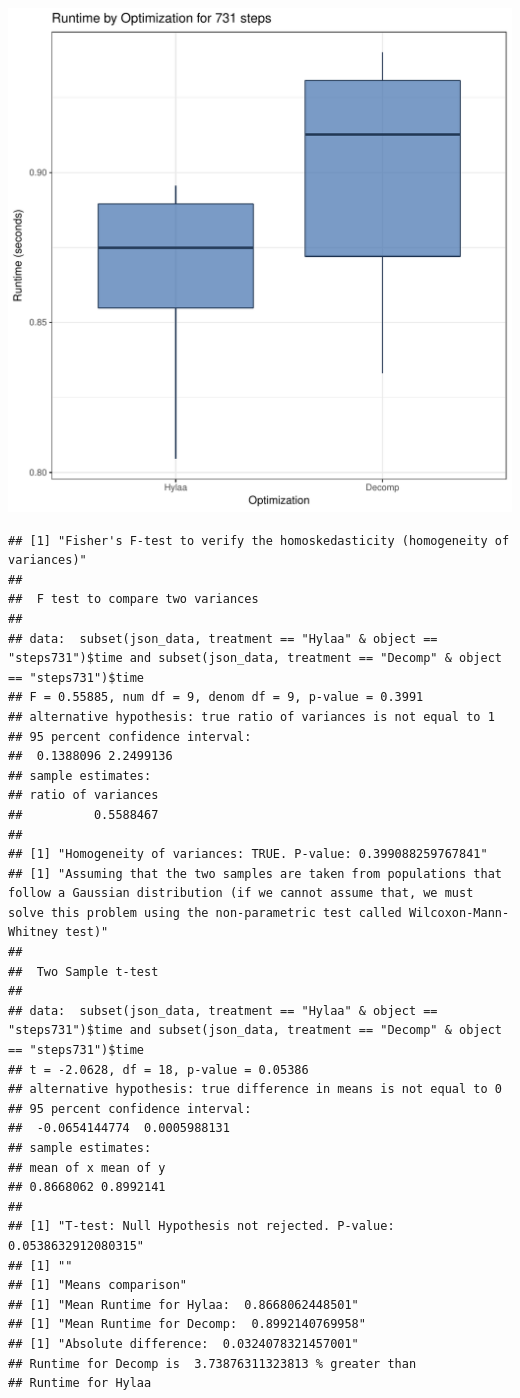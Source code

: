 \documentclass{article}\usepackage[]{graphicx}\usepackage[]{color}
\makeatletter
\def\maxwidth{ %
  \ifdim\Gin@nat@width>\linewidth
    \linewidth
  \else
    \Gin@nat@width
  \fi
}
\newenvironment{kframe}{%
 \def\at@end@of@kframe{}%
 \ifinner\ifhmode%
  \def\at@end@of@kframe{\end{minipage}}%
  \begin{minipage}{\columnwidth}%
 \fi\fi%
 \def\FrameCommand##1{\hskip\@totalleftmargin \hskip-\fboxsep
 \colorbox{shadecolor}{##1}\hskip-\fboxsep
     \hskip-\linewidth \hskip-\@totalleftmargin \hskip\columnwidth}%
 \MakeFramed {\advance\hsize-\width
   \@totalleftmargin\z@ \linewidth\hsize
   \@setminipage}}%
 {\par\unskip\endMakeFramed%
 \at@end@of@kframe}
\newenvironment{knitrout}{}{} %
\makeatother
\begin{document}
\begin{knitrout}
\color{fgcolor}
\includegraphics[width=\maxwidth]{figure/RH2_steps731-1} 
\begin{kframe}\begin{verbatim}
## [1] "Fisher's F-test to verify the homoskedasticity (homogeneity of variances)"
## 
## 	F test to compare two variances
## 
## data:  subset(json_data, treatment == "Hylaa" & object == "steps731")$time and subset(json_data, treatment == "Decomp" & object == "steps731")$time
## F = 0.55885, num df = 9, denom df = 9, p-value = 0.3991
## alternative hypothesis: true ratio of variances is not equal to 1
## 95 percent confidence interval:
##  0.1388096 2.2499136
## sample estimates:
## ratio of variances 
##          0.5588467 
## 
## [1] "Homogeneity of variances: TRUE. P-value: 0.399088259767841"
## [1] "Assuming that the two samples are taken from populations that follow a Gaussian distribution (if we cannot assume that, we must solve this problem using the non-parametric test called Wilcoxon-Mann-Whitney test)"
## 
## 	Two Sample t-test
## 
## data:  subset(json_data, treatment == "Hylaa" & object == "steps731")$time and subset(json_data, treatment == "Decomp" & object == "steps731")$time
## t = -2.0628, df = 18, p-value = 0.05386
## alternative hypothesis: true difference in means is not equal to 0
## 95 percent confidence interval:
##  -0.0654144774  0.0005988131
## sample estimates:
## mean of x mean of y 
## 0.8668062 0.8992141 
## 
## [1] "T-test: Null Hypothesis not rejected. P-value: 0.0538632912080315"
## [1] ""
## [1] "Means comparison"
## [1] "Mean Runtime for Hylaa:  0.8668062448501"
## [1] "Mean Runtime for Decomp:  0.8992140769958"
## [1] "Absolute difference:  0.0324078321457001"
## Runtime for Decomp is  3.73876311323813 % greater than 
## Runtime for Hylaa
\end{verbatim}
\end{kframe}
\end{knitrout}
\end{document}
